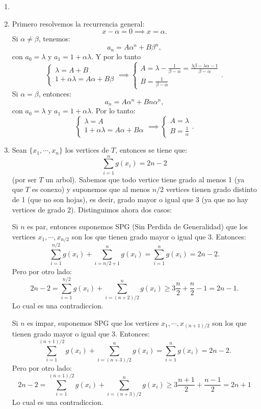 \documentclass{article}
\begin{document}
\begin{enumerate}
\item

\item Primero resolvemos la recurrencia general:
\[
x - \alpha = 0 \implies x = \alpha.
\]
Si $\alpha \neq \beta$, tenemos:
\[
a_n = A \alpha^n + B\beta^n,
\]
con $a_0 = \lambda$ y $a_1 = 1 + \alpha\lambda$. Y por lo tanto
\[
\begin{cases}
\lambda = A + B \\
1 + \alpha\lambda = A\alpha + B\beta
\end{cases}
\implies
\begin{cases}
A = \lambda - \frac{1}{\beta - \alpha} = \frac{\lambda\beta - \lambda\alpha - 1}{\beta - \alpha} \\
B = \frac{1}{\beta - \alpha}
\end{cases}.
\]
Si $\alpha = \beta$, entonces:
\[
a_n = A\alpha^n + Bn\alpha^n,
\]
con $a_0 = \lambda$ y $a_1 = 1 + \alpha\lambda$.
Por lo tanto:
\[
\begin{cases}
\lambda = A \\
1 + \alpha\lambda = A\alpha + B\alpha \\
\end{cases}
\implies
\begin{cases}
A = \lambda \\
B = \frac{1}{\alpha}
\end{cases}.
\]

\item Sean $\{ x_1, \cdots, x_n \}$ los vertices de $T$, entonces se tiene que:
\[
\sum_{i=1}^n g(x_i) =2n-2
\]
(por ser $T$ un arbol). Sabemos que todo vertice tiene grado al menos 1 (ya que $T$ es conexo)
y suponemos que al menos $n/2$ vertices tienen grado distinto de 1 (que no son hojas), es decir,
grado mayor o igual que 3 (ya que no hay vertices de grado 2). Distinguimos ahora dos casos:

Si $n$ es par, entonces suponemos SPG (Sin Perdida de 
Generalidad) que los vertices $x_1, \cdots, x_{n/2}$ son los que tienen grado mayor o igual que 3.
Entonces:
\[
\sum_{i=1}^{n/2} g(x_i) + \sum_{i=n/2 +1}^n g(x_i) = \sum_{i=1}^n g(x_i) =2n-2.
\]
Pero por otro lado:
\[
2n-2 =\sum_{i=1}^{n/2} g(x_i) + \sum_{i=(n+2)/2}^n g(x_i) \geq 3 \frac{n}{2} + \frac{n}{2} - 1 = 2n-1.
\]
Lo cual es una contradiccion.

Si $n$ es impar, suponemos SPG que los vertices $x_1, \cdots, x_{(n+1)/2}$ son los que tienen
grado mayor o igual que 3. Entonces:
 \[
 \sum_{i=1}^{(n+1)/2} g(x_i) + \sum_{i=(n+3)/2}^n g(x_i) = \sum_{i=1}^n g(x_i) =2n-2.
 \]
 Pero por otro lado:
\[
2n-2 =\sum_{i=1}^{(n+1)/2} g(x_i) + \sum_{i=(n+3)/2}^n g(x_i) \geq
3 \frac{n+1}{2} + \frac{n-1}{2}  = 2n + 1
\]
Lo cual es una contradiccion.


\end{enumerate}
\end{document}
